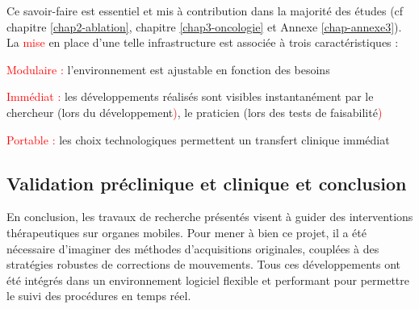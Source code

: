 Ce savoir-faire est essentiel et mis à contribution dans la majorité des études (cf chapitre \ref{chap2-ablation}, chapitre \ref{chap3-oncologie} et Annexe \ref{chap-annexe3}). La \textcolor{red}{mise} en place d’une telle infrastructure est associée à trois caractéristiques :
\begin{description}
\item \textcolor{red}{Modulaire :} l’environnement est ajustable en fonction des besoins
\item \textcolor{red}{Immédiat :} les développements réalisés sont visibles instantanément par le chercheur (lors du
développement\textcolor{red}{)}, le praticien (lors des tests de faisabilité\textcolor{red}{)}
\item \textcolor{red}{Portable :} les choix technologiques permettent un transfert clinique immédiat
\end{description}

\subsection{Validation préclinique et clinique et conclusion}
\label{chap4-conclusion}

En conclusion, les travaux de recherche présentés visent à guider des interventions thérapeutiques sur organes mobiles. Pour mener à bien ce projet, il a été nécessaire d’imaginer des méthodes d’acquisitions originales, couplées à des stratégies robustes de corrections de mouvements. Tous ces développements ont été intégrés dans un environnement logiciel flexible et performant pour permettre le suivi des procédures en temps réel.\\